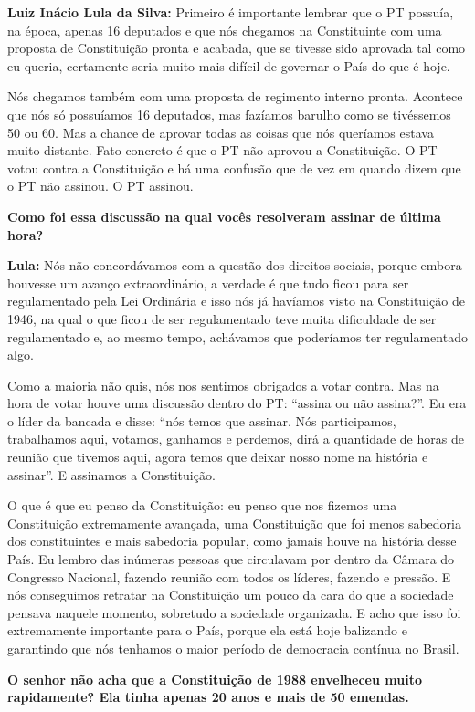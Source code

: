 \textbf{Luiz Inácio Lula da Silva:} Primeiro é importante lembrar que o
PT possuía, na época, apenas 16 deputados e que nós chegamos na
Constituinte com uma proposta de Constituição pronta e acabada, que se
tivesse sido aprovada tal como eu queria, certamente seria muito mais
difícil de governar o País do que é hoje.

Nós chegamos também com uma proposta de regimento interno pronta.
Acontece que nós só possuíamos 16 deputados, mas fazíamos barulho como
se tivéssemos 50 ou 60. Mas a chance de aprovar todas as coisas que nós
queríamos estava muito distante. Fato concreto é que o PT não aprovou a
Constituição. O PT votou contra a Constituição e há uma confusão que de
vez em quando dizem que o PT não assinou. O PT assinou.

\textbf{Como foi essa discussão na qual vocês resolveram assinar de
última hora? }

\textbf{Lula:} Nós não concordávamos com a questão dos direitos sociais,
porque embora houvesse um avanço extraordinário, a verdade é que tudo
ficou para ser regulamentado pela Lei Ordinária e isso nós já havíamos
visto na Constituição de 1946, na qual o que ficou de ser regulamentado
teve muita dificuldade de ser regulamentado e, ao mesmo tempo, achávamos
que poderíamos ter regulamentado algo.

Como a maioria não quis, nós nos sentimos obrigados a votar contra. Mas
na hora de votar houve uma discussão dentro do PT: ``assina ou não
assina?''. Eu era o líder da bancada e disse: ``nós temos que assinar.
Nós participamos, trabalhamos aqui, votamos, ganhamos e perdemos, dirá a
quantidade de horas de reunião que tivemos aqui, agora temos que deixar
nosso nome na história e assinar''. E assinamos a Constituição.

O que é que eu penso da Constituição: eu penso que nos fizemos uma
Constituição extremamente avançada, uma Constituição que foi menos
sabedoria dos constituintes e mais sabedoria popular, como jamais houve
na história desse País. Eu lembro das inúmeras pessoas que circulavam
por dentro da Câmara do Congresso Nacional, fazendo reunião com todos os
líderes, fazendo e pressão. E nós conseguimos retratar na Constituição
um pouco da cara do que a sociedade pensava naquele momento, sobretudo a
sociedade organizada. E acho que isso foi extremamente importante para o
País, porque ela está hoje balizando e garantindo que nós tenhamos o
maior período de democracia contínua no Brasil.

\textbf{O senhor não acha que a Constituição de 1988 envelheceu muito
rapidamente? Ela tinha apenas 20 anos e mais de 50 emendas.}

